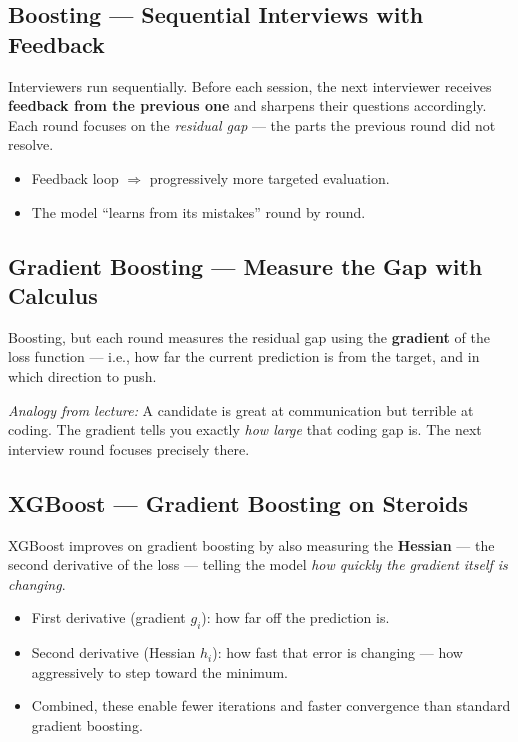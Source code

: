 \documentclass[11pt]{article}
\begin{document}
\subsection{Boosting --- Sequential Interviews with Feedback}
Interviewers run sequentially. Before each session, the next interviewer receives
\textbf{feedback from the previous one} and sharpens their questions accordingly.
Each round focuses on the \emph{residual gap} --- the parts the previous round did
not resolve.
\begin{itemize}
    \item Feedback loop $\Rightarrow$ progressively more targeted evaluation.
    \item The model ``learns from its mistakes'' round by round.
\end{itemize}

\subsection{Gradient Boosting --- Measure the Gap with Calculus}
Boosting, but each round measures the residual gap using the \textbf{gradient} of the
loss function --- i.e., how far the current prediction is from the target, and in
which direction to push.

\textit{Analogy from lecture:} A candidate is great at communication but terrible at
coding. The gradient tells you exactly \emph{how large} that coding gap is. The next
interview round focuses precisely there.

\subsection{XGBoost --- Gradient Boosting on Steroids}
XGBoost improves on gradient boosting by also measuring the \textbf{Hessian} --- the
second derivative of the loss --- telling the model \emph{how quickly the gradient
itself is changing}.

\begin{itemize}
    \item First derivative (gradient $g_i$): how far off the prediction is.
    \item Second derivative (Hessian $h_i$): how fast that error is changing --- how
      aggressively to step toward the minimum.
    \item Combined, these enable fewer iterations and faster convergence than standard
      gradient boosting.
\end{itemize}
\end{document}
